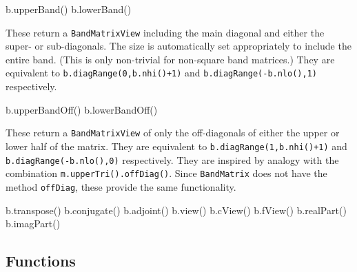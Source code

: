 \documentclass[twoside,letterpaper,11pt]{article}
\renewcommand{\tt}[1]{{\lstinline {#1}}}
\begin{document}
\begin{tmvcode}
b.upperBand()
b.lowerBand()
\end{tmvcode}
These return a \tt{BandMatrixView} including the main diagonal and either the
super- or sub-diagonals.  The size
is automatically set appropriately to include the entire band.  (This is only
non-trivial for non-square band matrices.)  They are equivalent to
\tt{b.diagRange(0,b.nhi()+1)} and \tt{b.diagRange(-b.nlo(),1)} respectively.

\begin{tmvcode}
b.upperBandOff()
b.lowerBandOff()
\end{tmvcode}
These return a \tt{BandMatrixView} of only the off-diagonals of either the
upper or lower half of the matrix.  They are equivalent to
\tt{b.diagRange(1,b.nhi()+1)} and \tt{b.diagRange(-b.nlo(),0)} respectively.  
They are inspired by analogy with the combination \tt{m.upperTri().offDiag()}.
Since \tt{BandMatrix} does not have the method \tt{offDiag}, these provide
the same functionality.

\begin{tmvcode}
b.transpose()
b.conjugate()
b.adjoint()
b.view()
b.cView()
b.fView()
b.realPart()
b.imagPart()
\end{tmvcode}
\vspace{12pt}

\subsection{Functions}
\label{BandMatrix_Functions}
\end{document}
